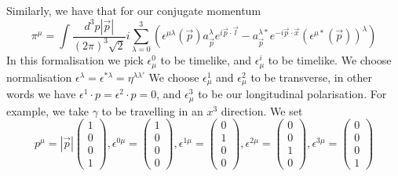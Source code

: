 Similarly, we have that for our conjugate momentum 
\[
 \pi ^ \mu  = \int \frac{ d ^ 3 p  | \vec{p} | }{ ( 2 \pi )^{ 3 } \sqrt{ 2 } }  i 
 \sum _{ \lambda = 0 } ^ 3 \left( \epsilon ^{ \mu \lambda  }  ( \vec{p} ) a _{ \vec{p}  }^ \lambda 
 e ^{ i \vec{p} \cdot  \vec{l} } -  a _{ \vec{p} } ^{ \lambda * } e ^{ - i \vec{p} \cdot  \vec{x} } 
 \left( \epsilon^{ \mu * } ( \vec{p} )  \right)  ^ \lambda \right)  
\] In this formalisation 
we pick $\epsilon ^ 0 _ \mu $ to be timelike, and $\epsilon _ \mu ^ i $ to be timelike. 
We choose normalisation $\epsilon ^ \lambda  = \epsilon ^{ * \lambda }  = \eta ^{ \lambda \lambda ' } $ 
We choose $ \epsilon ^ 1 _ \mu $ and $\epsilon ^ 2 _ \mu $ to be transverse, 
in other words we have $ \epsilon ^ 1 \cdot  p = \epsilon ^ 2 \cdot  p = 0  $, 
and $\epsilon ^ 3 _ \mu $ to be our longitudinal polarisation. For
example, we take $ \gamma $ to be travelling in an $x ^ 3 $ direction. 
We set 
\[
	p ^  \mu  = | \vec{p} | \begin{pmatrix}   1 \\ 0 \\ 0 \\ 1  \end{pmatrix}  , \epsilon ^{ 0 \mu }  = 
	\begin{pmatrix}  1 \\ 0 \\ 0 \\ 0  \end{pmatrix}  , \epsilon ^{ 1 \mu }  = 
	\begin{pmatrix}  0 \\ 1 \\ 0 \\ 0  \end{pmatrix}  , \epsilon ^{ 2  \mu }  = \begin{pmatrix}  
0 \\0 \\ 1 \\ 0  \end{pmatrix}, \epsilon ^{ 3 \mu } = \begin{pmatrix}  0 \\0 \\ 0 \\ 1  \end{pmatrix} 
\] 

